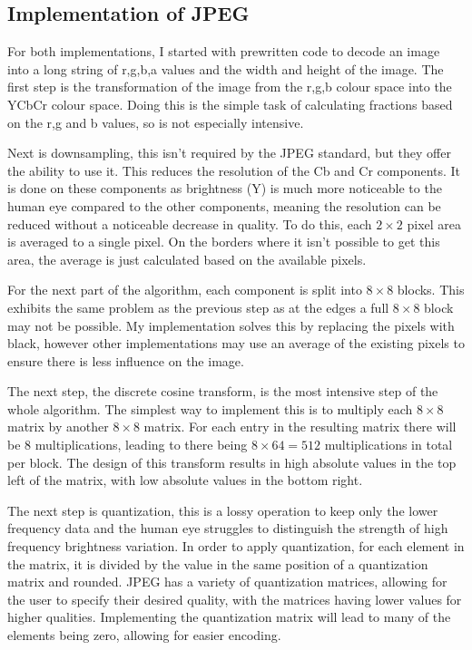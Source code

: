 \documentclass[12pt,a4paper]{article}
\begin{document}
\subsection{Implementation of JPEG}

For both implementations, I started with prewritten code to decode an image into a long string of r,g,b,a values and the width and height of the image. The first step is the transformation of the image from the r,g,b colour space into the YCbCr colour space. Doing this is the simple task of calculating fractions based on the r,g and b values, so is not especially intensive.

Next is downsampling, this isn't required by the JPEG standard, but they offer the ability to use it. This reduces the resolution of the Cb and Cr components. It is done on these components as brightness (Y) is much more noticeable to the human eye compared to the other components, meaning the resolution can be reduced without a noticeable decrease in quality. To do this, each $2\times 2$ pixel area is averaged to a single pixel. On the borders where it isn't possible to get this area, the average is just calculated based on the available pixels.

For the next part of the algorithm, each component is split into $8\times 8$ blocks. This exhibits the same problem as the previous step as at the edges a full $8\times 8$ block may not be possible. My implementation solves this by replacing the pixels with black, however other implementations may use an average of the existing pixels to ensure there is less influence on the image.

The next step, the discrete cosine transform, is the most intensive step of the whole algorithm. The simplest way to implement this is to multiply each $8\times 8$ matrix by another $8\times 8$ matrix. For each entry in the resulting matrix there will be $8$ multiplications, leading to there being $8\times 64 = 512$ multiplications in total per block. The design of this transform results in high absolute values in the top left of the matrix, with low absolute values in the bottom right.

The next step is quantization, this is a lossy operation to keep only the lower frequency data and the human eye struggles to distinguish the strength of high frequency brightness variation. In order to apply quantization, for each element in the matrix, it is divided by the value in the same position of a quantization matrix and rounded. JPEG has a variety of quantization matrices, allowing for the user to specify their desired quality, with the matrices having lower values for higher qualities. Implementing the quantization matrix will lead to many of the elements being zero, allowing for easier encoding.
\end{document}
